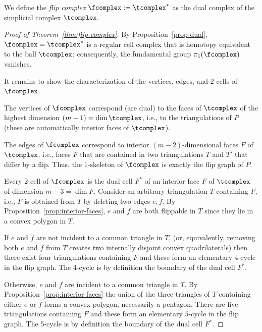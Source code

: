 We define the \emph{flip complex} $\fcomplex:=\tcomplex^*$ 
as the dual complex of the simplicial complex  $\tcomplex$. 


\begin{proof}[Proof of Theorem~\ref{thm:flip-complex}] 
By Proposition~\ref{prop-dual}, $\fcomplex=\tcomplex^*$ is a regular cell complex that is homotopy equivalent to the ball 
$\tcomplex$; consequently, the fundamental group $\pi_1(\fcomplex)$ vanishes. 

It remains to show the characterization of the vertices, edges, and $2$-cells of $\fcomplex$.%

The vertices of $\fcomplex$ correspond (are dual) 
to the faces of $\tcomplex$ of the highest dimension $(m-1)=\dim \tcomplex$, i.e., to the triangulations of $P$ (these are automatically interior faces of $\tcomplex$). 

The edges of $\fcomplex$ correspond to interior $(m-2)$-dimensional faces $F$ of $\tcomplex$,
i.e., faces $F$ that are contained in two triangulations $T$ and $T'$ that differ by a flip.
Thus, the $1$-skeleton of $\fcomplex$ is exactly the flip graph of $P$.

Every $2$-cell of $\fcomplex$ is the dual cell $F^*$ of an interior face $F$ of 
$\tcomplex$ of dimension $m-3 = \dim F$.
Consider an arbitrary triangulation $T$ containing $F$, i.e., $F$ is obtained
from $T$ by deleting two edges $e,f$. 
By Proposition~\ref{prop:interior-faces}, $e$ and $f$ are both flippable in $T$ since they lie in a convex polygon in $T$.

If $e$ and $f$ are not incident to a common triangle in $T$, (or, equivalently, removing both $e$ and $f$ from $T$ creates two internally disjoint convex quadrilaterals) then there exist four triangulations containing $F$
and these form an elementary $4$-cycle in the flip graph. The $4$-cycle is by definition the boundary of the 
dual cell $F^*$. 

Otherwise, $e$ and $f$ are incident to a common triangle in $T$.  By Proposition~\ref{prop:interior-faces} the union of the three triangles of $T$ containing either $e$ or $f$ forms a convex polygon, necessarily a pentagon.
There are five 
triangulations containing $F$ and these form an elementary $5$-cycle in the flip graph. 
The 5-cycle is by definition the boundary of the dual cell $F^*$.


\end{proof}
